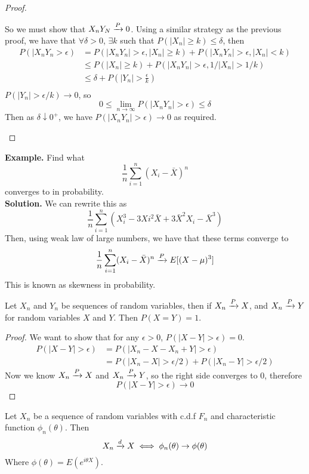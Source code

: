 \documentclass[openany]{report}
\begin{document}
\begin{proof}
\begin{enumerate}[label=(\roman*)]
        So we must show that $X_nY_N \xrightarrow{P} 0$. Using a similar strategy as the previous proof, we have that $\forall \delta > 0$, $\exists k$ such that $P(|X_n| \geq k) \leq \delta$, then 
        \begin{align*}
            P(|X_nY_n > \epsilon) &= P(|X_nY_n| > \epsilon, |X_n| \geq k) + P(|X_nY_n| > \epsilon, |X_n| < k)\\
            &\leq P(|X_n| \geq k) + P(|X_nY_n| > \epsilon, 1/|X_n| > 1/k)\\
            &\leq \delta + P\left(|Y_n| > \frac{\epsilon}{k}\right)\\
        \end{align*}
        $P(|Y_n| > \epsilon/k) \rightarrow 0$, so 
        \[0 \leq \lim_{n\rightarrow \infty} P(|X_nY_n| > \epsilon) \leq \delta\]
        Then as $\delta \downarrow 0^+$, we have $P(|X_nY_n| > \epsilon) \rightarrow 0$ as required.
    \end{enumerate}
\end{proof}
\noindent
\textbf{Example.} Find what 
\[\frac{1}{n}\sum_{i=1}^n (X_i-\bar{X})^n\]
converges to in probability.\\[2ex]
\textbf{Solution.} We can rewrite this as
\[\frac{1}{n}\sum_{i=1}^n (X_i^3 - 3Xi^2\bar{X} + 3\bar{X}^2X_i - \bar{X}^3)\]
Then, using weak law of large numbers, we have that these terms converge to 
\[\frac{1}{n}\sum_{i=1}^n (X_i -\bar{X})^n \xrightarrow{P} E[(X-\mu)^3]\]
This is known as skewness in probability.
\begin{theorem}
    Let $X_n$ and $Y_n$ be sequences of random variables, then if $X_n \xrightarrow{P} X$, and $X_n \xrightarrow{P} Y$ for random variables $X$ and $Y$. Then $P(X = Y) = 1$.
\end{theorem}
\begin{proof}
    We want to show that for any $\epsilon >0$, $P(|X-Y| > \epsilon) = 0$.
    \begin{align*}
        P(|X-Y| > \epsilon) &= P(|X_n - X - X_n +Y| > \epsilon)\\
        &= P(|X_n - X| > \epsilon/2) + P(|X_n - Y| > \epsilon/2)
    \end{align*}    
    Now we know $X_n \xrightarrow{P} X$ and $X_n \xrightarrow{P} Y$, so the right side converges to 0, therefore
    \[P(|X-Y| > \epsilon) \rightarrow 0\]
\end{proof}
\begin{theorem}
    Let $X_n$ be a sequence of random variables with c.d.f $F_n$ and characteristic function $\phi_n(\theta)$. Then 
    \[X_n \xrightarrow{d} X \iff \phi_n(\theta) \rightarrow \phi(\theta)\]
    Where $\phi(\theta) = E(e^{i\theta X})$. 
\end{theorem}
\end{document}
